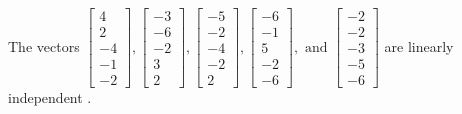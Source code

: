 \begin{exercise}
\begin{exerciseStatement}
  \end{exerciseStatement}
  \begin{exerciseAnswer}
   The vectors \(\left[\begin{array}{r}
4 \\
2 \\
-4 \\
-1 \\
-2
\end{array}\right] , \left[\begin{array}{r}
-3 \\
-6 \\
-2 \\
3 \\
2
\end{array}\right] , \left[\begin{array}{r}
-5 \\
-2 \\
-4 \\
-2 \\
2
\end{array}\right] , \left[\begin{array}{r}
-6 \\
-1 \\
5 \\
-2 \\
-6
\end{array}\right] , \text{ and } \left[\begin{array}{r}
-2 \\
-2 \\
-3 \\
-5 \\
-6
\end{array}\right]\) are 
  	 linearly independent  .
  


  \end{exerciseAnswer}
\end{exercise}